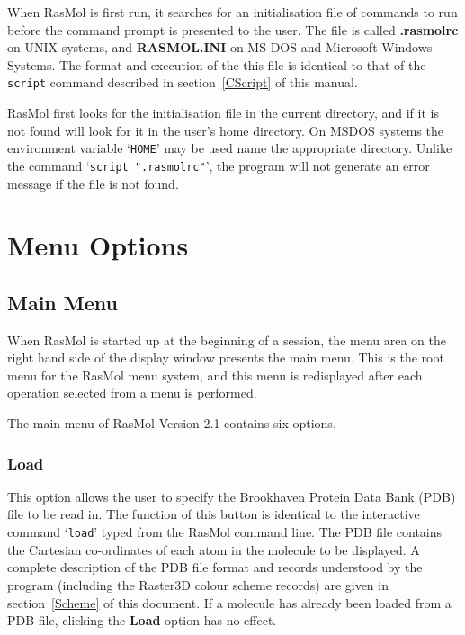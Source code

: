 When RasMol is first run, it searches for an initialisation file of commands
to run before the command prompt is presented to the user. The file is 
called {\bf {.}rasmolrc} on UNIX systems, and {\bf RASMOL.INI} on MS-DOS
and Microsoft Windows Systems. The format and execution of the this file
is identical to that of the {\tt script} command described in 
section~\ref{CScript} of this manual. 

RasMol first looks for the initialisation file in the current directory,
and if it is not found will look for it in the user's home directory. On
MSDOS systems the environment variable `{\tt HOME}' may be used name the
appropriate directory. Unlike the command `{\tt script ".rasmolrc"}', the
program will not generate an error message if the file is not found.


\section{Menu Options}
\label{Options}

\subsection{Main Menu}
\label{Main}
When RasMol is started up at the beginning of a session, the menu area
on the right hand side of the display window presents the main menu. This
is the root menu for the RasMol menu system, and this menu is redisplayed
after each operation selected from a menu is performed.

The main menu of RasMol Version 2.1 contains six options. 

\subsubsection{Load}
\label{MLoad}
This option allows the user to specify the Brookhaven Protein Data Bank 
(PDB) file to be read in. The function of this button is identical to the 
interactive command `{\tt load}' typed from the RasMol command line. The 
PDB file contains the Cartesian co-ordinates of each atom in the molecule 
to be displayed. A complete description of the PDB file format and records 
understood by the program (including the Raster3D colour scheme records) 
are given in section~\ref{Scheme} of this document. If a molecule has 
already been loaded from a PDB file, clicking the {\bf Load} option has no 
effect.

